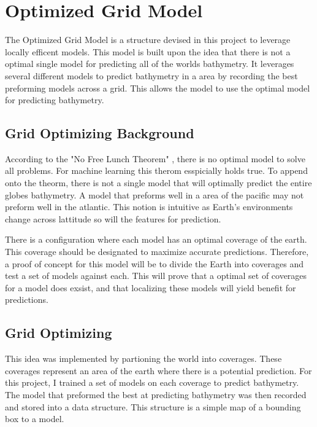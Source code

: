 \section{Optimized Grid Model}
\setlength{\parindent}{10ex}
The Optimized Grid Model is a structure devised in this project to leverage locally efficent models.
This model is built upon the idea that there is not a optimal single model for predicting all of the worlds bathymetry.
It leverages several different models to predict bathymetry in a area by recording the best preforming models across a grid.
This allows the model to use the optimal model for predicting bathymetry.

\subsection{Grid Optimizing Background}
According to the "No Free Lunch Theorem" \cite{wolpert1997no}, there is no optimal model to solve all problems.
For machine learning this therom esspicially holds true.
To append onto the theorm, there is not a single model that will optimally predict the entire globes bathymetry.
A model that preforms well in a area of the pacific may not preform well in the atlantic.
This notion is intuitive as Earth's environments change across lattitude so will the features for prediction.

\par
There is a configuration where each model has an optimal coverage of the earth.
This coverage should be designated to maximize accurate predictions.
Therefore, a proof of concept for this model will be to divide the Earth into coverages and test a set of models against each.
This will prove that a optimal set of coverages for a model does exsist, and that localizing these models will yield benefit for predictions.

\subsection{Grid Optimizing}
This idea was implemented by partioning the world into coverages.
These coverages represent an area of the earth where there is a potential prediction.
For this project, I trained a set of models on each coverage to predict bathymetry.
The model that preformed the best at predicting bathymetry was then recorded and stored into a data structure.
This structure is a simple map of a bounding box to a model.

